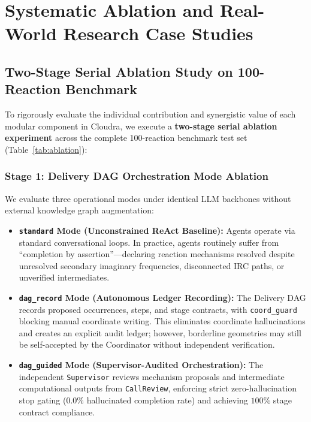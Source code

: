 \documentclass[10pt,twocolumn,letterpaper]{article}
\begin{document}
\section{Systematic Ablation and Real-World Research Case Studies}

\subsection{Two-Stage Serial Ablation Study on 100-Reaction Benchmark}
To rigorously evaluate the individual contribution and synergistic value of each modular component in Cloudra, we execute a \textbf{two-stage serial ablation experiment} across the complete 100-reaction benchmark test set (Table~\ref{tab:ablation}):

\subsubsection{Stage 1: Delivery DAG Orchestration Mode Ablation}
We evaluate three operational modes under identical LLM backbones without external knowledge graph augmentation:
\begin{itemize}[leftmargin=*]
\item \textbf{\texttt{standard} Mode (Unconstrained ReAct Baseline):} Agents operate via standard conversational loops. In practice, agents routinely suffer from ``completion by assertion''---declaring reaction mechanisms resolved despite unresolved secondary imaginary frequencies, disconnected IRC paths, or unverified intermediates.
\item \textbf{\texttt{dag\_record} Mode (Autonomous Ledger Recording):} The Delivery DAG records proposed occurrences, steps, and stage contracts, with \texttt{coord\_guard} blocking manual coordinate writing. This eliminates coordinate hallucinations and creates an explicit audit ledger; however, borderline geometries may still be self-accepted by the Coordinator without independent verification.
\item \textbf{\texttt{dag\_guided} Mode (Supervisor-Audited Orchestration):} The independent \texttt{Supervisor} reviews mechanism proposals and intermediate computational outputs from \texttt{CallReview}, enforcing strict zero-hallucination stop gating ($0.0\%$ hallucinated completion rate) and achieving $100\%$ stage contract compliance.
\end{itemize}
\end{document}
